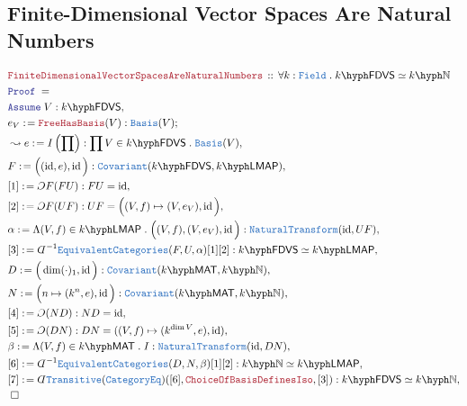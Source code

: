 \documentclass[12pt]{scrartcl}%
\newcommand{\TYPE}[1]{\textcolor{NavyBlue}{\mathtt{#1}}}%
\newcommand{\LOGIC}[1]{\textcolor{Blue}{\mathtt{#1}}}%
\newcommand{\THM}[1]{\textcolor{Maroon}{\mathtt{#1}}}%
\renewcommand{\.}{\; . \;} %
\newcommand{\de}{: \kern 0.1pc =} %
\newcommand{\Act}[1]{\left( #1 \right)} %
\newcommand{\Theorem}[2]{& \THM{#1} \, :: \, #2 \\ & \Proof = \\ } %
\newcommand{\Page}[1]{ \begin{align*} #1 \end{align*}  }%
\newcommand{ \bd }{ \ByDef }%
\DeclareMathOperator*{\id}{id}%
\newcommand{\Say}[3]{& #1 \de #2 : #3, \\} %
\newcommand{\Conclude}[3]{& #1 \de #2 : #3; \\}%
\newcommand{\Derive}[3]{& \leadsto #1 \de #2 : #3, \\} %
\newcommand{\Assume}[2]{& \LOGIC{Assume} \; #1 : #2, \\} %
\newcommand{\QED}{\; \square} %
\newcommand{\EndProof}{& \QED \\} %
\newcommand{\ByDef}{\rotatebox[origin=c]{-180}{$D$}}%
\newcommand{\ByConstr}{\rotatebox[origin=c]{-180}{$C$}}%
\newcommand{\Proof}{\LOGIC{Proof} \; } %
\newcommand{\Cov}{\TYPE{Covariant}}%
\newcommand{\NT}{\TYPE{NaturalTransform}}%
\newcommand{\Basis}{\TYPE{Basis}} %
\newcommand{\FDVS}[1]{#1\hyph\mathsf{FDVS}} %
\newcommand{\LLMAP}[1]{#1\hyph\mathsf{LMAP}} %
\newcommand{\LMAT}[1]{#1\hyph\mathsf{MAT}}  %
\newcommand{\NMAT}[1]{#1\hyph\mathbb{N}} %
\newcommand{\Field}{\TYPE{Field}}
\begin{document}
\subsection{Finite-Dimensional Vector Spaces Are Natural Numbers}
\Page{
	\Theorem{FiniteDimensionalVectorSpacesAreNaturalNumbers}{\forall k : \Field \. \FDVS{k} \simeq \NMAT{k}}
	\Assume{V}{\FDVS{k}}
	\Conclude{e_V}{\THM{FreeHasBasis}(V)}{\Basis(V)}
	\Derive{e}{I\Act{\prod}}{ \prod V \in \FDVS{k} \. \Basis(V)}
	\Say{F}{\Big( (\id,e),\id \Big)}{\Cov(\FDVS{k},\LLMAP{k})}
	\Say{[1]}{\ByConstr F (FU)}{ FU = \id}
	\Say{[2]}{\ByConstr F (UF)}{ UF = \Big( (V,f) \mapsto (V,e_V), \id   \Big)}
	\Say{\alpha}{\Lambda (V,f) \in \LLMAP{k} \. \Big((V,f),(V,e_V),\id \Big)}{\NT(\id,UF)}
	\Say{[3]}{\bd^{-1}\TYPE{EquivalentCategories}(F,U,\alpha)[1][2]}{ \FDVS{k} \simeq \LLMAP{k} }
	\Say{D}{ \Big(  \dim(\cdot)_1, \id \Big) }{\Cov(\LMAT{k},\NMAT{k})}
	\Say{N}{ \Big( n \mapsto (k^n,e) , \id  \Big)}{ \Cov(\LMAT{k},\NMAT{k}) }
	\Say{[4]}{\ByConstr (ND)}{ ND = \id}
	\Say{[5]}{\ByConstr (DN)}{ DN = ( (V,f) \mapsto (k^{\dim V},e), \id  )  } 
	\Say{\beta}{\Lambda (V,f) \in \LMAT{k} \. I}{\NT(\id,DN)}
	\Say{[6]}{\bd^{-1}\TYPE{EquivalentCategories}(D,N,\beta)[1][2]}{ \NMAT{k} \simeq \LLMAP{k} }
	\Say{[7]}{\bd \TYPE{Transitive}(\TYPE{CategoryEq})([6], \THM{ChoiceOfBasisDefinesIso} ,[3]) }{  \FDVS{k} \simeq \NMAT{k} }
	\EndProof
}
\newpage
\end{document}
